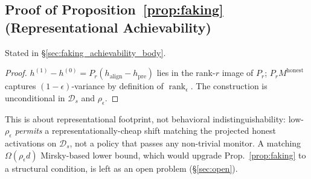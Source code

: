 \documentclass[10pt]{article}
\theoremstyle{definition}
\theoremstyle{remark}
\begin{document}
\subsection{Proof of Proposition~\ref{prop:faking} (Representational Achievability)}
\label{app:faking_achievability}

Stated in \S\ref{sec:faking_achievability_body}.

\begin{proof}
$h^{(1)} - h^{(0)} = P_r(h_{\mathrm{align}} - h_{\mathrm{pre}})$
lies in the rank-$r$ image of $P_r$;
$P_r M^{\mathrm{honest}}$ captures $(1-\epsilon)$-variance
by definition of $\operatorname{rank}_{\epsilon}$.  The
construction is unconditional in $\mathcal{D}_s$ and
$\rho_{\epsilon}$.
\end{proof}

This is about representational footprint, not
behavioral indistinguishability: low-$\rho_{\epsilon}$
\emph{permits} a representationally-cheap shift
matching the projected honest activations on
$\mathcal{D}_s$, not a policy that passes any
non-trivial monitor.  A matching $\Omega(\rho_{\epsilon} d)$
Mirsky-based lower bound, which would upgrade
Prop.~\ref{prop:faking} to a structural condition, is
left as an open problem (\S\ref{sec:open}).
\end{document}
